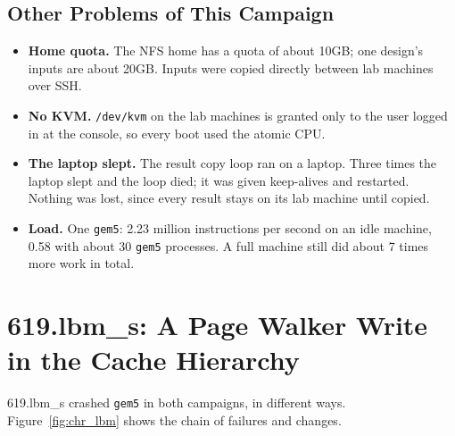 \subsection{Other Problems of This Campaign}
\begin{itemize}
    \item \textbf{Home quota.} The NFS home has a quota of about 10GB; one design's inputs are about 20GB. Inputs were copied directly between lab machines over SSH.
    \item \textbf{No KVM.} \texttt{/dev/kvm} on the lab machines is granted only to the user logged in at the console, so every boot used the atomic CPU.
    \item \textbf{The laptop slept.} The result copy loop ran on a laptop. Three times the laptop slept and the loop died; it was given keep-alives and restarted. Nothing was lost, since every result stays on its lab machine until copied.
    \item \textbf{Load.} One \texttt{gem5}: 2.23 million instructions per second on an idle machine, 0.58 with about 30 \texttt{gem5} processes. A full machine still did about 7 times more work in total.
\end{itemize}

\section{619.lbm\_s: A Page Walker Write in the Cache Hierarchy}
\label{sec:chr_lbm}

619.lbm\_s crashed \texttt{gem5} in both campaigns, in different ways. Figure~\ref{fig:chr_lbm} shows the chain of failures and changes.

